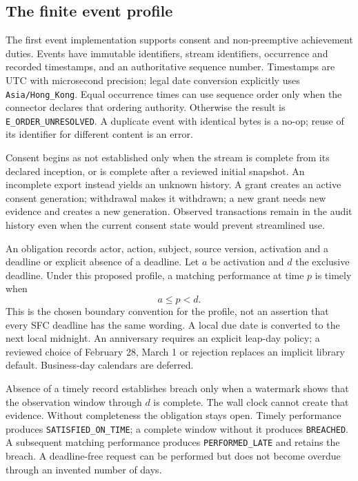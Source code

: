 \subsection{The finite event profile}
\label{merge:P-03b-event-contract:00}


The first event implementation supports consent and non-preemptive achievement
duties. Events have immutable identifiers, stream identifiers, occurrence and
recorded timestamps, and an authoritative sequence number. Timestamps are UTC
with microsecond precision; legal date conversion explicitly uses
\texttt{Asia/Hong\_Kong}. Equal occurrence times can use sequence order only
when the connector declares that ordering authority. Otherwise the result is
\texttt{E\_ORDER\_UNRESOLVED}. A duplicate event with identical bytes is a
no-op; reuse of its identifier for different content is an error.

Consent begins as not established only when the stream is complete from its
declared inception, or is complete after a reviewed initial snapshot. An incomplete export
instead yields an unknown history. A grant creates an active consent generation;
withdrawal makes it withdrawn; a new grant needs new evidence and creates a new
generation. Observed transactions remain in the audit history even when the
current consent state would prevent streamlined use.


An obligation records actor, action, subject, source version, activation and a
deadline or explicit absence of a deadline. Let $a$ be activation and $d$ the
exclusive deadline. Under this proposed profile, a matching performance at time
$p$ is timely when
\begin{equation}
 a\leq p<d.
 \label{eq:timely}
\end{equation}
This is the chosen boundary convention for the profile, not an assertion that
every SFC deadline has the same wording. A local due date is converted to the
next local midnight. An anniversary requires an explicit leap-day policy; a
reviewed choice of February 28, March 1 or rejection replaces an implicit library
default. Business-day calendars are deferred.

Absence of a timely record establishes breach only when a watermark shows that
the observation window through $d$ is complete. The wall clock cannot create
that evidence. Without completeness the obligation stays open. Timely performance
produces \texttt{SATISFIED\_ON\_TIME}; a complete window without it produces
\texttt{BREACHED}. A subsequent matching performance produces
\texttt{PERFORMED\_LATE} and retains the breach. A deadline-free request can be
performed but does not become overdue through an invented number of days.

